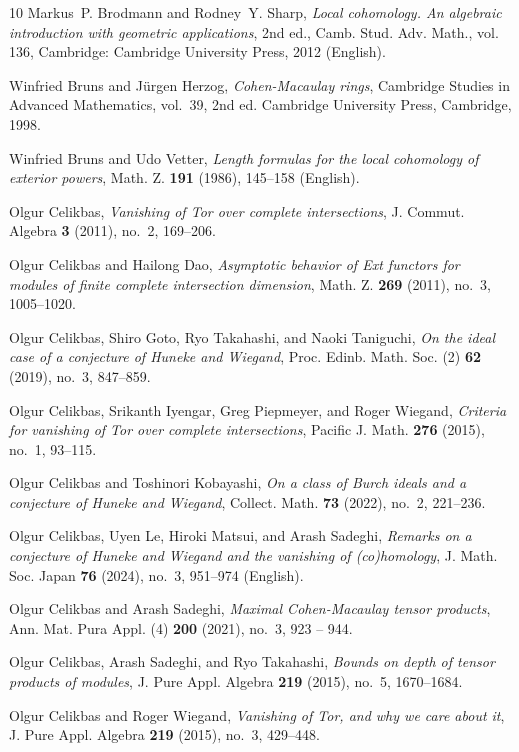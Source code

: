 \documentclass[11pt]{amsart}
\theoremstyle{definition}
\theoremstyle{definition}
\numberwithin{equation}{section}
\begin{document}
\begin{thebibliography}{10}
Markus~P. Brodmann and Rodney~Y. Sharp, \emph{Local cohomology. {An} algebraic
  introduction with geometric applications}, 2nd ed., Camb. Stud. Adv.
  Math., vol. 136, Cambridge: Cambridge University Press, 2012 (English).

Winfried Bruns and J\"{u}rgen Herzog, \emph{Cohen-{M}acaulay rings}, Cambridge
  Studies in Advanced Mathematics, vol.~39, 2nd ed. Cambridge University Press,
  Cambridge, 1998.

Winfried Bruns and Udo Vetter, \emph{Length formulas for the local cohomology
  of exterior powers}, Math. Z. \textbf{191} (1986), 145--158 (English).

Olgur Celikbas, \emph{Vanishing of {T}or over complete intersections}, J.
  Commut. Algebra \textbf{3} (2011), no.~2, 169--206.

Olgur Celikbas and Hailong Dao, \emph{Asymptotic behavior of {E}xt functors for
  modules of finite complete intersection dimension}, Math. Z. \textbf{269}
  (2011), no.~3, 1005--1020.

Olgur Celikbas, Shiro Goto, Ryo Takahashi, and Naoki Taniguchi, \emph{On the
  ideal case of a conjecture of {H}uneke and {W}iegand}, Proc. Edinb. Math.
  Soc. (2) \textbf{62} (2019), no.~3, 847--859.

Olgur Celikbas, Srikanth Iyengar, Greg Piepmeyer, and Roger Wiegand,
  \emph{Criteria for vanishing of {T}or over complete intersections}, Pacific
  J. Math. \textbf{276} (2015), no.~1, 93--115.

Olgur Celikbas and Toshinori Kobayashi, \emph{On a class of {B}urch ideals and
  a conjecture of {H}uneke and {W}iegand}, Collect. Math. \textbf{73} (2022),
  no.~2, 221--236.

Olgur Celikbas, Uyen Le, Hiroki Matsui, and Arash Sadeghi, \emph{Remarks on a
  conjecture of {Huneke} and {Wiegand} and the vanishing of (co)homology}, J.
  Math. Soc. Japan \textbf{76} (2024), no.~3, 951--974 (English).

Olgur Celikbas and Arash Sadeghi, \emph{Maximal {C}ohen-{M}acaulay tensor
  products}, Ann. Mat. Pura Appl. (4) \textbf{200} (2021), no.~3, 923 -- 944.

Olgur Celikbas, Arash Sadeghi, and Ryo Takahashi, \emph{Bounds on depth of
  tensor products of modules}, J. Pure Appl. Algebra \textbf{219} (2015),
  no.~5, 1670--1684.

Olgur Celikbas and Roger Wiegand, \emph{Vanishing of {T}or, and why we care
  about it}, J. Pure Appl. Algebra \textbf{219} (2015), no.~3, 429--448.


\end{thebibliography}
\end{document}
